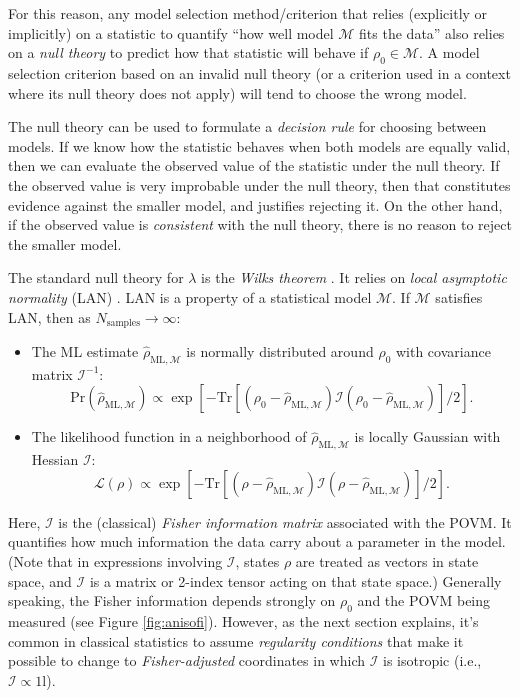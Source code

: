 \documentclass[aps,pra, twocolumn]{revtex4-1}
\newcommand{\M}{\mathcal{M}}
\newcommand{\Id}{\mathbb{I}}
\def\Id{1\!\mathrm{l}}
\newcommand{\Fi}{\mathcal{I}}
\newcommand{\rhohat}{\hat{\rho}}
\newcommand{\rhoML}[1]{\rhohat_{\scriptscriptstyle{\mathrm{ML},#1}}}
\begin{document}
For this reason, any model selection method/criterion that relies (explicitly or implicitly) on a statistic to quantify ``how well model $\M$ fits the data'' also relies on a \emph{null theory} to predict how that statistic will behave if $\rho_{0} \in \M$.  A model selection criterion based on an invalid null theory (or a criterion used in a context where its null theory does not apply) will tend to choose the wrong model.

The null theory can be used to formulate a \emph{decision rule} for choosing between models. If we know how the statistic behaves when both models are equally valid, then we can evaluate the observed value of the statistic under the null theory. If the observed value is very improbable under the null theory, then that constitutes evidence against the smaller model, and justifies rejecting it. On the other hand, if the observed value is \emph{consistent} with the null theory, there is no reason to reject the smaller model.

The standard null theory for $\lambda$ is the \emph{Wilks theorem} \cite{Wilks1938}. It relies on \emph{local asymptotic normality} (LAN) \cite{LeCam1970, LeCam1956}. LAN is a property of a statistical model $\M$. If $\M$ satisfies LAN, then as $N_{\mathrm{samples}}\rightarrow \infty$:
\begin{itemize}[nosep]
\item The ML estimate $\rhoML{\M}$ is normally distributed around $\rho_{0}$ with covariance matrix $\Fi^{-1}$:
\begin{equation}
\label{eq:landist}
\mathrm{Pr}(\rhoML{\M}) \propto \exp\left[-\mathrm{Tr}[(\rho_{0} - \rhoML{\M})\mathcal{I}(\rho_{0} -\rhoML{\M})]/2\right].
\end{equation}
\item The likelihood function in a neighborhood of $\rhoML{\M}$ is locally Gaussian with Hessian $\Fi$:
\begin{equation}
\label{eq:lanl}
\mathcal{L}(\rho) \propto \exp\left[-\mathrm{Tr}[(\rho - \rhoML{\M})\mathcal{I}(\rho - \rhoML{\M})]/2\right].
\end{equation}
\end{itemize}
Here, $\Fi$ is the (classical) \emph{Fisher information matrix} associated with the POVM. It quantifies how much information the data carry about a parameter in the model.  (Note that in expressions involving $\mathcal{I}$, states $\rho$ are treated as vectors in state space, and $\mathcal{I}$ is a matrix or 2-index tensor acting on that state space.) Generally speaking, the Fisher information depends strongly on $\rho_{0}$ and the POVM being measured (see Figure \ref{fig:anisofi}). However, as the next section explains, it's common in classical statistics to assume \emph{regularity conditions} that make it possible to change to \emph{Fisher-adjusted} coordinates in which $\mathcal{I}$ is isotropic (i.e., $\mathcal{I} \propto \Id$).
\end{document}
